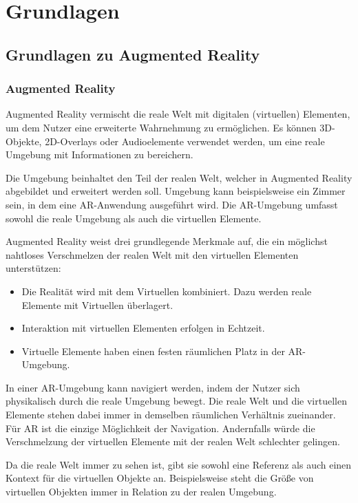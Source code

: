 \newpage
\section{Grundlagen}
\subsection{Grundlagen zu Augmented Reality}
\subsubsection{Augmented Reality}

Augmented Reality vermischt die reale Welt mit digitalen (virtuellen) Elementen, um dem Nutzer eine erweiterte Wahrnehmung zu ermöglichen. Es können 3D-Objekte, 2D-Overlays oder Audioelemente verwendet werden, um eine reale Umgebung mit Informationen zu bereichern. 

Die Umgebung beinhaltet den Teil der realen Welt, welcher in Augmented Reality abgebildet und erweitert werden soll. Umgebung kann beispielsweise ein Zimmer sein, in dem eine AR-Anwendung ausgeführt wird. Die AR-Umgebung umfasst sowohl die reale Umgebung als auch die virtuellen Elemente.

Augmented Reality weist drei grundlegende Merkmale auf, die ein möglichst nahtloses Verschmelzen der realen Welt mit den virtuellen Elementen unterstützen: 
\begin{itemize}
	\item Die Realität wird mit dem Virtuellen kombiniert. Dazu werden reale Elemente mit Virtuellen überlagert.
	\item Interaktion mit virtuellen Elementen erfolgen in Echtzeit.
	\item Virtuelle Elemente haben einen festen räumlichen Platz in der AR-Umgebung.
\end{itemize}

In einer AR-Umgebung kann navigiert werden, indem der Nutzer sich physikalisch durch die reale Umgebung bewegt. Die reale Welt und die virtuellen Elemente stehen dabei immer in demselben räumlichen Verhältnis zueinander. Für AR ist die einzige Möglichkeit der Navigation. Andernfalls würde die Verschmelzung der virtuellen Elemente mit der realen Welt schlechter gelingen.

Da die reale Welt immer zu sehen ist, gibt sie sowohl eine Referenz als auch einen Kontext für die virtuellen Objekte an. 
Beispielsweise steht die Größe von virtuellen Objekten immer in Relation zu der realen Umgebung.\citep{GrundlagenAR}

